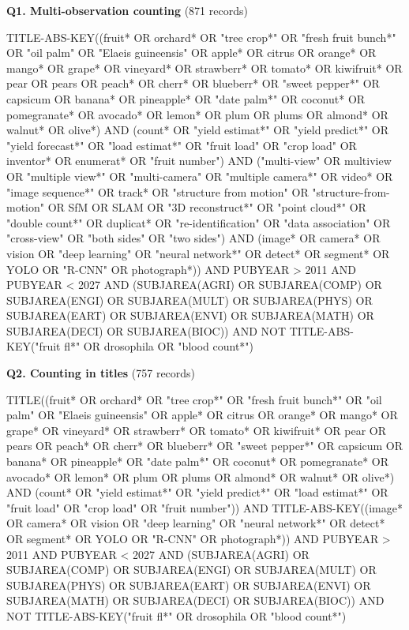 \par\medskip\noindent\textbf{Q1. Multi-observation counting} (871 records)\par\nobreak\smallskip
{\noindent\scriptsize\ttfamily\raggedright TITLE-ABS-KEY((fruit* OR orchard* OR "tree crop*" OR "fresh fruit bunch*" OR "oil palm" OR "Elaeis guineensis" OR apple* OR citrus OR orange* OR mango* OR grape* OR vineyard* OR strawberr* OR tomato* OR kiwifruit* OR pear OR pears OR peach* OR cherr* OR blueberr* OR "sweet pepper*" OR capsicum OR banana* OR pineapple* OR "date palm*" OR coconut* OR pomegranate* OR avocado* OR lemon* OR plum OR plums OR almond* OR walnut* OR olive*) AND (count* OR "yield estimat*" OR "yield predict*" OR "yield forecast*" OR "load estimat*" OR "fruit load" OR "crop load" OR inventor* OR enumerat* OR "fruit number") AND ("multi-view" OR multiview OR "multiple view*" OR "multi-camera" OR "multiple camera*" OR video* OR "image sequence*" OR track* OR "structure from motion" OR "structure-from-motion" OR SfM OR SLAM OR "3D reconstruct*" OR "point cloud*" OR "double count*" OR duplicat* OR "re-identification" OR "data association" OR "cross-view" OR "both sides" OR "two sides") AND (image* OR camera* OR vision OR "deep learning" OR "neural network*" OR detect* OR segment* OR YOLO OR "R-CNN" OR photograph*)) AND PUBYEAR > 2011 AND PUBYEAR < 2027 AND (SUBJAREA(AGRI) OR SUBJAREA(COMP) OR SUBJAREA(ENGI) OR SUBJAREA(MULT) OR SUBJAREA(PHYS) OR SUBJAREA(EART) OR SUBJAREA(ENVI) OR SUBJAREA(MATH) OR SUBJAREA(DECI) OR SUBJAREA(BIOC)) AND NOT TITLE-ABS-KEY("fruit fl*" OR drosophila OR "blood count*")\par}
\par\medskip\noindent\textbf{Q2. Counting in titles} (757 records)\par\nobreak\smallskip
{\noindent\scriptsize\ttfamily\raggedright TITLE((fruit* OR orchard* OR "tree crop*" OR "fresh fruit bunch*" OR "oil palm" OR "Elaeis guineensis" OR apple* OR citrus OR orange* OR mango* OR grape* OR vineyard* OR strawberr* OR tomato* OR kiwifruit* OR pear OR pears OR peach* OR cherr* OR blueberr* OR "sweet pepper*" OR capsicum OR banana* OR pineapple* OR "date palm*" OR coconut* OR pomegranate* OR avocado* OR lemon* OR plum OR plums OR almond* OR walnut* OR olive*) AND (count* OR "yield estimat*" OR "yield predict*" OR "load estimat*" OR "fruit load" OR "crop load" OR "fruit number")) AND TITLE-ABS-KEY((image* OR camera* OR vision OR "deep learning" OR "neural network*" OR detect* OR segment* OR YOLO OR "R-CNN" OR photograph*)) AND PUBYEAR > 2011 AND PUBYEAR < 2027 AND (SUBJAREA(AGRI) OR SUBJAREA(COMP) OR SUBJAREA(ENGI) OR SUBJAREA(MULT) OR SUBJAREA(PHYS) OR SUBJAREA(EART) OR SUBJAREA(ENVI) OR SUBJAREA(MATH) OR SUBJAREA(DECI) OR SUBJAREA(BIOC)) AND NOT TITLE-ABS-KEY("fruit fl*" OR drosophila OR "blood count*")\par}
